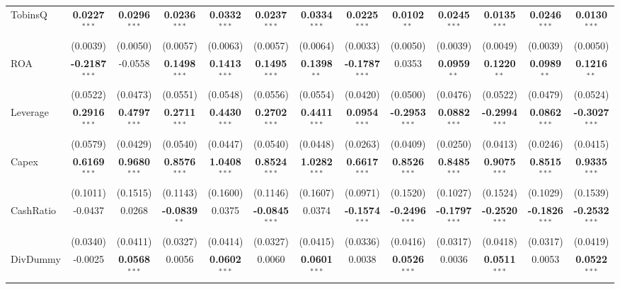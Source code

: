 \begin{landscape}
\begin{table}[H]
\begin{tabular}{lcccccccccccc}
TobinsQ & \textbf{0.0227}$^{***}$ & \textbf{0.0296}$^{***}$ & \textbf{0.0236}$^{***}$ & \textbf{0.0332}$^{***}$ & \textbf{0.0237}$^{***}$ & \textbf{0.0334}$^{***}$ & \textbf{0.0225}$^{***}$ & \textbf{0.0102}$^{**}$ & \textbf{0.0245}$^{***}$ & \textbf{0.0135}$^{***}$ & \textbf{0.0246}$^{***}$ & \textbf{0.0130}$^{***}$ \\
 & (0.0039) & (0.0050) & (0.0057) & (0.0063) & (0.0057) & (0.0064) & (0.0033) & (0.0050) & (0.0039) & (0.0049) & (0.0039) & (0.0050) \\
ROA & \textbf{-0.2187}$^{***}$ & -0.0558 & \textbf{0.1498}$^{***}$ & \textbf{0.1413}$^{***}$ & \textbf{0.1495}$^{***}$ & \textbf{0.1398}$^{**}$ & \textbf{-0.1787}$^{***}$ & 0.0353 & \textbf{0.0959}$^{**}$ & \textbf{0.1220}$^{**}$ & \textbf{0.0989}$^{**}$ & \textbf{0.1216}$^{**}$ \\
 & (0.0522) & (0.0473) & (0.0551) & (0.0548) & (0.0556) & (0.0554) & (0.0420) & (0.0500) & (0.0476) & (0.0522) & (0.0479) & (0.0524) \\
Leverage & \textbf{0.2916}$^{***}$ & \textbf{0.4797}$^{***}$ & \textbf{0.2711}$^{***}$ & \textbf{0.4430}$^{***}$ & \textbf{0.2702}$^{***}$ & \textbf{0.4411}$^{***}$ & \textbf{0.0954}$^{***}$ & \textbf{-0.2953}$^{***}$ & \textbf{0.0882}$^{***}$ & \textbf{-0.2994}$^{***}$ & \textbf{0.0862}$^{***}$ & \textbf{-0.3027}$^{***}$ \\
 & (0.0579) & (0.0429) & (0.0540) & (0.0447) & (0.0540) & (0.0448) & (0.0263) & (0.0409) & (0.0250) & (0.0413) & (0.0246) & (0.0415) \\
Capex & \textbf{0.6169}$^{***}$ & \textbf{0.9680}$^{***}$ & \textbf{0.8576}$^{***}$ & \textbf{1.0408}$^{***}$ & \textbf{0.8524}$^{***}$ & \textbf{1.0282}$^{***}$ & \textbf{0.6617}$^{***}$ & \textbf{0.8526}$^{***}$ & \textbf{0.8485}$^{***}$ & \textbf{0.9075}$^{***}$ & \textbf{0.8515}$^{***}$ & \textbf{0.9335}$^{***}$ \\
 & (0.1011) & (0.1515) & (0.1143) & (0.1600) & (0.1146) & (0.1607) & (0.0971) & (0.1520) & (0.1027) & (0.1524) & (0.1029) & (0.1539) \\
CashRatio & -0.0437 & 0.0268 & \textbf{-0.0839}$^{**}$ & 0.0375 & \textbf{-0.0845}$^{***}$ & 0.0374 & \textbf{-0.1574}$^{***}$ & \textbf{-0.2496}$^{***}$ & \textbf{-0.1797}$^{***}$ & \textbf{-0.2520}$^{***}$ & \textbf{-0.1826}$^{***}$ & \textbf{-0.2532}$^{***}$ \\
 & (0.0340) & (0.0411) & (0.0327) & (0.0414) & (0.0327) & (0.0415) & (0.0336) & (0.0416) & (0.0317) & (0.0418) & (0.0317) & (0.0419) \\
DivDummy & -0.0025 & \textbf{0.0568}$^{***}$ & 0.0056 & \textbf{0.0602}$^{***}$ & 0.0060 & \textbf{0.0601}$^{***}$ & 0.0038 & \textbf{0.0526}$^{***}$ & 0.0036 & \textbf{0.0511}$^{***}$ & 0.0053 & \textbf{0.0522}$^{***}$ \\

\end{tabular}
\end{table}
\end{landscape}

